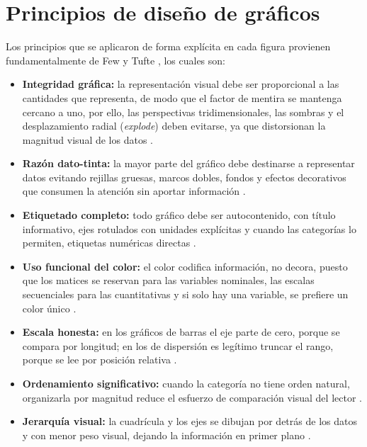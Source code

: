 \section{Principios de diseño de gráficos}
\label{design_principles}
    Los principios que se aplicaron de forma explícita en cada figura provienen
    fundamentalmente de Few \cite{few2012show} y Tufte \cite{tufte2001visual}, los
    cuales son:

    \vspace{10pt}

    \begin{itemize}
        \item \textbf{Integridad gráfica:} la representación visual debe ser
        proporcional a las cantidades que representa, de modo que el factor de mentira
        se mantenga cercano a uno, por ello, las perspectivas tridimensionales, las
        sombras y el desplazamiento radial (\textit{explode}) deben evitarse, ya que
        distorsionan la magnitud visual de los datos
        \cite{few2012show}.

        \item \textbf{Razón dato-tinta:} la mayor parte del gráfico debe destinarse a
        representar datos evitando rejillas gruesas, marcos dobles, fondos y efectos
        decorativos que consumen la atención sin aportar información
        \cite{few2012show}.

        \item \textbf{Etiquetado completo:} todo gráfico debe ser autocontenido, con
        título informativo, ejes rotulados con unidades explícitas y cuando las
        categorías lo permiten, etiquetas numéricas directas \cite{few2012show}.

        \item \textbf{Uso funcional del color:} el color codifica información, no
        decora, puesto que los matices se reservan para las variables nominales, las
        escalas secuenciales para las cuantitativas y si solo hay una variable, se
        prefiere un color único \cite{few2012show}.

        \item \textbf{Escala honesta:} en los gráficos de barras el eje parte de cero,
        porque se compara por longitud; en los de dispersión es legítimo truncar el
        rango, porque se lee por posición relativa \cite{few2012show}.

        \item \textbf{Ordenamiento significativo:} cuando la categoría no tiene orden
        natural, organizarla por magnitud reduce el esfuerzo de comparación visual del
        lector \cite{few2012show}.

        \item \textbf{Jerarquía visual:} la cuadrícula y los ejes se dibujan por detrás
        de los datos y con menor peso visual, dejando la información en primer plano
        \cite{few2012show}.
    \end{itemize}